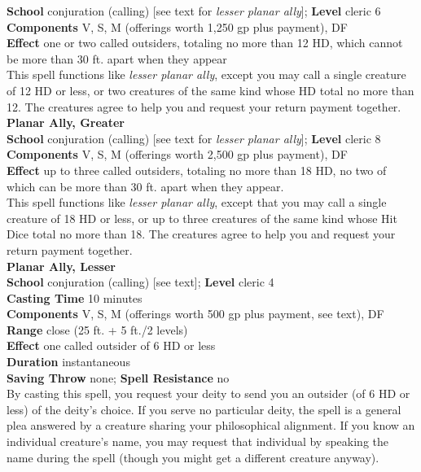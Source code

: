 \textbf{School} conjuration (calling) [see text for \textit{lesser planar ally}]; \textbf{Level} cleric 6\\
\textbf{Components} V, S, M (offerings worth 1,250 gp plus payment), DF\\
\textbf{Effect} one or two called outsiders, totaling no more than 12 HD, which cannot be more than 30 ft. apart when they appear\\
This spell functions like \textit{lesser planar ally}, except you may call a single creature of 12 HD or less, or two creatures of the same kind whose HD total no more than 12. The creatures agree to help you and request your return payment together.\\
\textbf{Planar Ally, Greater}\\
\textbf{School} conjuration (calling) [see text for \textit{lesser planar ally}]; \textbf{Level} cleric 8\\
\textbf{Components} V, S, M (offerings worth 2,500 gp plus payment), DF\\
\textbf{Effect} up to three called outsiders, totaling no more than 18 HD, no two of which can be more than 30 ft. apart when they appear.\\
This spell functions like \textit{lesser planar ally}, except that you may call a single creature of 18 HD or less, or up to three creatures of the same kind whose Hit Dice total no more than 18. The creatures agree to help you and request your return payment together.\\
\textbf{Planar Ally, Lesser}\\
\textbf{School} conjuration (calling) [see text]; \textbf{Level} cleric 4\\
\textbf{Casting Time} 10 minutes\\
\textbf{Components} V, S, M (offerings worth 500 gp plus payment, see text), DF\\
\textbf{Range} close (25 ft. + 5 ft./2 levels)\\
\textbf{Effect} one called outsider of 6 HD or less\\
\textbf{Duration} instantaneous\\
\textbf{Saving Throw} none; \textbf{Spell Resistance} no\\
By casting this spell, you request your deity to send you an outsider (of 6 HD or less) of the deity's choice. If you serve no particular deity, the spell is a general plea answered by a creature sharing your philosophical alignment. If you know an individual creature's name, you may request that individual by speaking the name during the spell (though you might get a different creature anyway).\\
